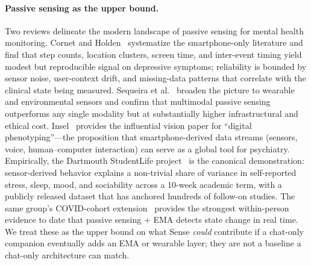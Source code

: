 \documentclass[11pt,a4paper]{article}
\begin{document}
\paragraph{Passive sensing as the upper bound.}
Two reviews delineate the modern landscape of passive sensing for
mental health monitoring. Cornet and Holden~\cite{Cornet2018PassiveSensing}
systematize the smartphone-only literature and find that step
counts, location clusters, screen time, and inter-event timing
yield modest but reproducible signal on depressive symptoms;
reliability is bounded by sensor noise, user-context drift, and
missing-data patterns that correlate with the clinical state being
measured. Sequeira et al.~\cite{Sequeira2021PassiveSensing} broaden
the picture to wearable and environmental sensors and confirm that
multimodal passive sensing outperforms any single modality but at
substantially higher infrastructural and ethical cost.
Insel~\cite{Insel2018DigitalPhenotyping} provides the influential
vision paper for ``digital phenotyping''---the proposition that
smartphone-derived data streams (sensors, voice, human--computer
interaction) can serve as a global tool for psychiatry. Empirically,
the Dartmouth StudentLife project~\cite{Wang2014StudentLife} is the
canonical demonstration: sensor-derived behavior explains a
non-trivial share of variance in self-reported stress, sleep, mood,
and sociability across a 10-week academic term, with a publicly
released dataset that has anchored hundreds of follow-on studies.
The same group's COVID-cohort
extension~\cite{Wang2020COVIDStudentLife} provides the strongest
within-person evidence to date that passive sensing $+$ EMA detects
state change in real time. We treat these as the upper bound on what
Sense \emph{could} contribute if a chat-only companion eventually
adds an EMA or wearable layer; they are not a baseline a chat-only
architecture can match.
\end{document}
